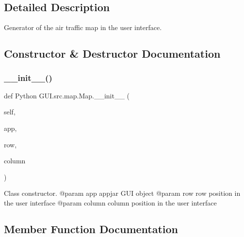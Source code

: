 \subsection{Detailed Description}
\begin{DoxyVerb}Generator of the air traffic map in the user interface.\end{DoxyVerb}
 

\subsection{Constructor \& Destructor Documentation}
\mbox{\label{class_python_01_g_u_i_1_1src_1_1map_1_1_map_aead37e89075bd390f6aa26530917e692}} 
\subsubsection{\texorpdfstring{\+\_\+\+\_\+init\+\_\+\+\_\+()}{\_\_init\_\_()}}
{\footnotesize\ttfamily def Python G\+U\+I.\+src.\+map.\+Map.\+\_\+\+\_\+init\+\_\+\+\_\+ (\begin{DoxyParamCaption}\item[{}]{self,  }\item[{}]{app,  }\item[{}]{row,  }\item[{}]{column }\end{DoxyParamCaption})}

\begin{DoxyVerb}Class constructor.
    @param app       appjar GUI object
    @param row       row position in the user interface
    @param column    column position in the user interface
\end{DoxyVerb}
 

\subsection{Member Function Documentation}
\mbox{\label{class_python_01_g_u_i_1_1src_1_1map_1_1_map_ae34c947dccc93eb838994545a5c0ba94}} 
